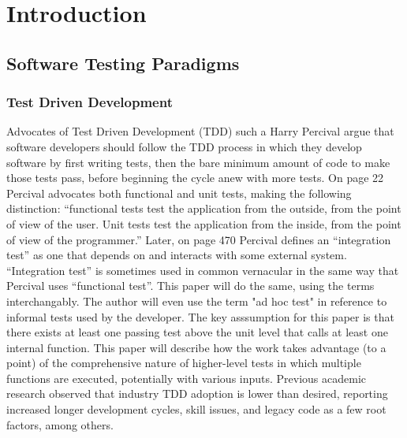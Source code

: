 \section{Introduction}\label{sec:introduction}

\subsection{Software Testing Paradigms}\label{sec:intro-3}

\subsubsection{Test Driven Development}\label{sec:intro-}
Advocates of Test Driven Development (TDD) such a Harry Percival
 \cite{percival2014test} argue that software developers should
follow the TDD process in which they develop software by first writing tests,
then the bare minimum amount of code to make those tests pass,
before beginning the cycle anew with more tests.
%
On page 22 \cite{percival2014test} Percival advocates both functional and
 unit tests, making the following distinction:
“functional tests test the application from the outside, from the point of view
of the user. Unit tests test the application from the inside,
from the point of view of the programmer.”
%
Later, on page 470 \cite{percival2014test} Percival defines an “integration test” as
one that depends on and interacts with some external system.
%
“Integration test” is sometimes used in common vernacular in the same way that
Percival uses “functional test”.
%
This paper will do the same, using the terms interchangably.  The author will 
even use the term "ad hoc test" in reference to informal tests used by the developer.  
The key asssumption for this paper is that there exists at least one passing 
test above the unit level that calls at least one internal function.  This 
paper will describe how the work takes advantage (to a point) of the 
comprehensive nature of higher-level tests in which multiple functions are 
executed, potentially with various inputs.
%
Previous academic research \cite{causevic2011factors, ramzan2024test} observed
 that industry TDD adoption is lower than desired,
reporting increased longer development cycles, skill issues, and legacy code as 
a few root factors, among others.
%
